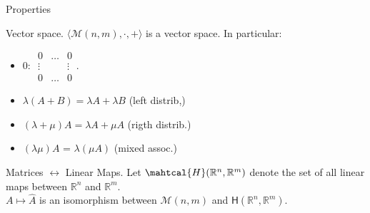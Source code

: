 \documentclass{beamer}
\begin{document}
\begin{frame}{Properties}

  \begin{block}{Vector space.}
    $\langle \mathcal{M}(n, m), \cdot, {+}\rangle$ is a vector space. In particular:
    \begin{itemize}
    \item $0$: $\begin{array}{|ccc|} 0 & \dots & 0\\ \vdots & & \vdots\\ 0 & \dots & 0 \end{array}$.
    \item $\lambda (A + B) = \lambda A + \lambda B$ (left distrib,)
    \item $(\lambda + \mu) A = \lambda A + \mu A$ (rigth distrib.)
    \item $(\lambda \mu) A$ = $\lambda (\mu A)$ (mixed assoc.)
    \end{itemize}
  \end{block}

  \begin{block}{Matrices $\leftrightarrow$ Linear Maps.}
    Let $\mahtcal{H}(\mathbb{R}^n, \mathbb{R}^m)$ denote the set of all linear maps between $\mathbb{R}^n$ and $\mathbb{R}^m$.\\
    $A \mapsto \hat{A}$ is an isomorphism between $\mathcal{M}(n,m)$ and $\textsf{H}(\mathbb{R}^n, \mathbb{R}^m)$.
  \end{block}

\end{frame}
\end{document}
